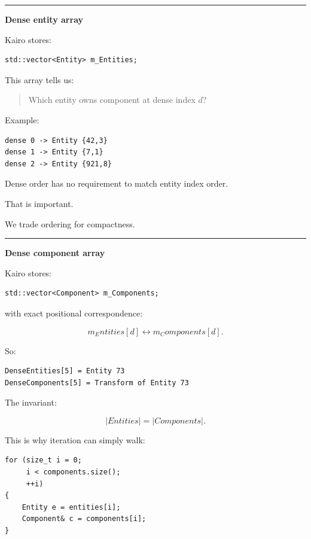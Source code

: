 \begin{center}\rule{0.5\linewidth}{0.5pt}\end{center}

\textbf{Dense entity array}

Kairo stores:

\begin{verbatim}
std::vector<Entity> m_Entities;
\end{verbatim}

This array tells us:

\begin{quote}
Which entity owns component at dense index \(d\)?
\end{quote}

Example:

\begin{verbatim}
dense 0 -> Entity {42,3}
dense 1 -> Entity {7,1}
dense 2 -> Entity {921,8}
\end{verbatim}

Dense order has no requirement to match entity index order.

That is important.

We trade ordering for compactness.

\begin{center}\rule{0.5\linewidth}{0.5pt}\end{center}

\textbf{Dense component array}

Kairo stores:

\begin{verbatim}
std::vector<Component> m_Components;
\end{verbatim}

with exact positional correspondence:

\[
m_Entities[d]
\leftrightarrow
m_Components[d].
\]

So:

\begin{verbatim}
DenseEntities[5] = Entity 73
DenseComponents[5] = Transform of Entity 73
\end{verbatim}

The invariant:

\[
|Entities|=|Components|.
\]

This is why iteration can simply walk:

\begin{verbatim}
for (size_t i = 0;
     i < components.size();
     ++i)
{
    Entity e = entities[i];
    Component& c = components[i];
}
\end{verbatim}

